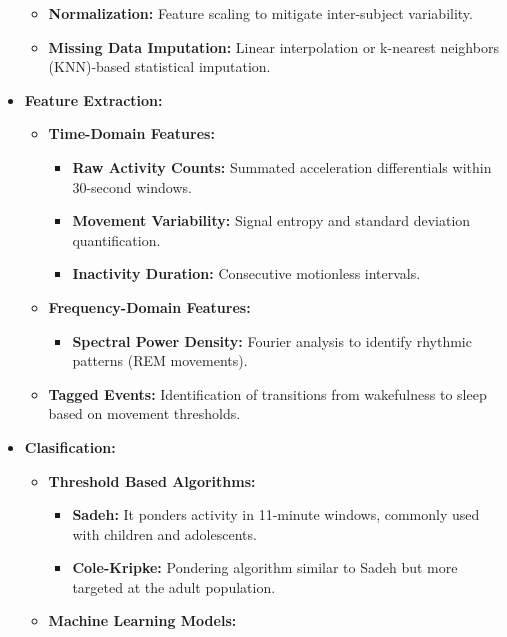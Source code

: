 \documentclass[conference]{IEEEtran}
\begin{document}
\begin{itemize}
\begin{itemize}
		      \item \textbf{Normalization:} Feature scaling to mitigate inter-subject variability.
                \item \textbf{Missing Data Imputation:} Linear interpolation or k-nearest neighbors (KNN)-based statistical imputation.
	      \end{itemize}
    \item \textbf{Feature Extraction:}
            \begin{itemize}
		      \item \textbf{Time-Domain Features:}
                    \begin{itemize}
		              \item \textbf{Raw Activity Counts:}  Summated acceleration differentials within 30-second windows.
		              \item \textbf{Movement Variability:} Signal entropy and standard deviation quantification.
                        \item \textbf{Inactivity Duration:} Consecutive motionless intervals.
	               \end{itemize}
		      \item \textbf{Frequency-Domain Features:}
                    \begin{itemize}
                        \item \textbf{Spectral Power Density:} Fourier analysis to identify rhythmic patterns (REM movements).
                    \end{itemize}
                \item \textbf{Tagged Events:} Identification of transitions from wakefulness to sleep based on movement thresholds.
	      \end{itemize}
    \item \textbf{Clasification:}
            \begin{itemize}
		      \item \textbf{Threshold Based Algorithms:}
                    \begin{itemize}
                        \item \textbf{Sadeh:} It ponders activity in 11-minute windows, commonly used with children and adolescents.
                        \item \textbf{Cole-Kripke:} Pondering algorithm similar to Sadeh but more targeted at the adult population.
                    \end{itemize}
                \item \textbf{Machine Learning Models:}

\end{itemize}
\end{itemize}
\end{document}
